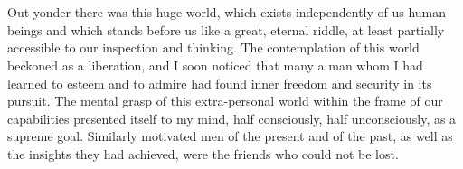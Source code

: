 \begingroup
\let\clearpage\relax
\let\cleardoublepage\relax
\let\cleardoublepage\relax
\chapter*{}
Out yonder there was this huge world, which exists independently of us human beings and which stands before us like a great, eternal riddle, at least partially accessible to our inspection and thinking. The contemplation of this world beckoned as a liberation, and I soon noticed that many a man whom I had learned to esteem and to admire had found inner freedom and security in its pursuit. The mental grasp of this extra-personal world within the frame of our capabilities presented itself to my mind, half consciously, half unconsciously, as a supreme goal. Similarly motivated men of the present and of the past, as well as the insights they had achieved, were the friends who could not be lost.\\
\endgroup
